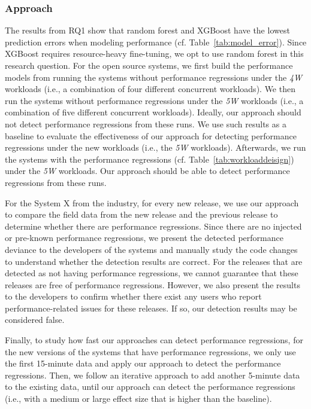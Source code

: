 \subsubsection*{Approach}

The results from RQ1 show that random forest and XGBoost have the lowest prediction errors when modeling performance (cf. Table~\ref{tab:model_error}). Since XGBoost requires resource-heavy fine-tuning, we opt to use random forest in this research question. For the open source systems, we first build the performance models from running the systems without performance regressions under the \emph{4W} workloads (i.e., a combination of four different concurrent workloads). We then run the systems without performance regressions under the \emph{5W} workloads (i.e., a combination of five different concurrent workloads). Ideally, our approach should not detect performance regressions from these runs. 
We use such results as a baseline to evaluate the effectiveness of our approach for detecting performance regressions under the new workloads (i.e., the \emph{5W} workloads). 
Afterwards, we run the systems with the performance regressions (cf. Table~\ref{tab:workloaddeisign}) under the \emph{5W} workloads. Our approach should be able to detect performance regressions from these runs.

For the System X from the industry, for every new release, we use our approach to compare the field data from the new release and the previous release to determine whether there are performance regressions. Since there are no injected or pre-known performance regressions, we present the detected performance deviance to the developers of the systems and manually study the code changes to understand whether the detection results are correct. For the releases that are detected as not having performance regressions, we cannot guarantee that these releases are free of performance regressions. However, we also present the results to the developers to confirm whether there exist any users who report performance-related issues for these releases. If so, our detection results may be considered false.

Finally, to study how fast our approaches can detect performance regressions, for the new versions of the systems that have performance regressions, we only use the first 15-minute data and apply our approach to detect the performance regressions. Then, we follow an iterative approach to add another 5-minute data to the existing data, until our approach can detect the performance regressions (i.e., with a medium or large effect size that is higher than the baseline). 

